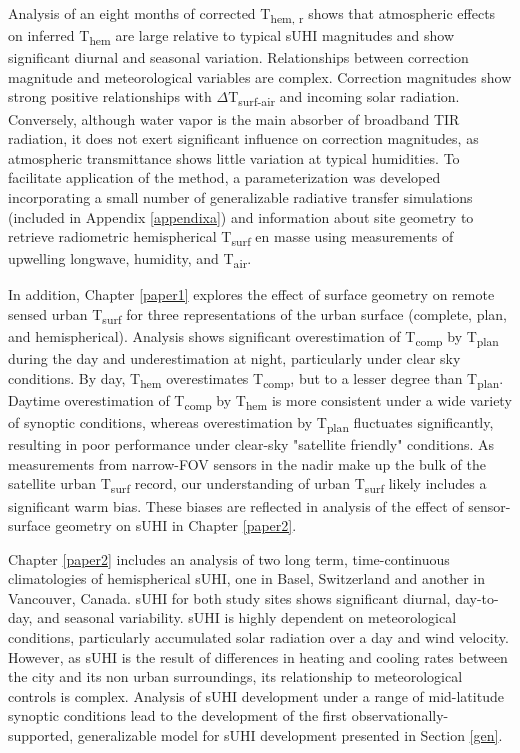 \begin{bibunit}
Analysis of an eight months of corrected T\textsubscript{hem, r} shows that atmospheric effects on inferred T\textsubscript{hem} are large relative to typical sUHI magnitudes and show significant diurnal and seasonal variation. Relationships between correction magnitude and meteorological variables are complex. Correction magnitudes show strong positive relationships with $\Delta$T\textsubscript{surf-air} and incoming solar radiation. Conversely, although water vapor is the main absorber of broadband TIR radiation, it does not exert significant influence on correction magnitudes, as atmospheric transmittance shows little variation at typical humidities. To facilitate application of the method, a parameterization was developed incorporating a small number of generalizable radiative transfer simulations (included in Appendix \ref{appendixa}) and information about site geometry to retrieve radiometric hemispherical T\textsubscript{surf} en masse using measurements of upwelling longwave, humidity, and T\textsubscript{air}. 

In addition, Chapter \ref{paper1} explores the effect of surface geometry on remote sensed urban T\textsubscript{surf} for three representations of the urban surface (complete, plan, and hemispherical). Analysis shows significant overestimation of T\textsubscript{comp} by T\textsubscript{plan} during the day and underestimation at night, particularly under clear sky conditions. By day, T\textsubscript{hem} overestimates T\textsubscript{comp}, but to a lesser degree than T\textsubscript{plan}. Daytime overestimation of T\textsubscript{comp} by T\textsubscript{hem} is more consistent under a wide variety of synoptic conditions, whereas overestimation by T\textsubscript{plan} fluctuates significantly, resulting in poor performance under clear-sky "satellite friendly" conditions. As measurements from narrow-FOV sensors in the nadir make up the bulk of the satellite urban T\textsubscript{surf} record, our understanding of urban T\textsubscript{surf} likely includes a significant warm bias. These biases are reflected in analysis of the effect of sensor-surface geometry on sUHI in Chapter \ref{paper2}.

Chapter \ref{paper2} includes an analysis of two long term, time-continuous climatologies of hemispherical sUHI, one in Basel, Switzerland and another in Vancouver, Canada. sUHI for both study sites shows significant diurnal, day-to-day, and seasonal variability. sUHI is highly dependent on meteorological conditions, particularly accumulated solar radiation over a day and wind velocity. However, as sUHI is the result of differences in heating and cooling rates between the city and its non urban surroundings, its relationship to meteorological controls is complex. Analysis of sUHI development under a range of mid-latitude synoptic conditions lead to the development of the first observationally-supported, generalizable model for sUHI development presented in Section \ref{gen}.


\end{bibunit}
